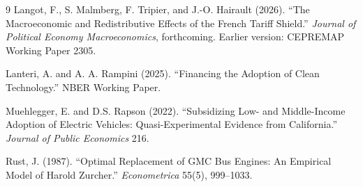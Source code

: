 \begin{thebibliography}{9}
Langot, F., S. Malmberg, F. Tripier, and J.-O. Hairault (2026).
``The Macroeconomic and Redistributive Effects of the French Tariff Shield.''
\emph{Journal of Political Economy Macroeconomics}, forthcoming.
Earlier version: CEPREMAP Working Paper 2305.

Lanteri, A. and A. A. Rampini (2025).
``Financing the Adoption of Clean Technology.'' NBER Working Paper.

Muehlegger, E. and D.S. Rapson (2022).
``Subsidizing Low- and Middle-Income Adoption of Electric Vehicles: Quasi-Experimental Evidence from California.''
\emph{Journal of Public Economics} 216.

Rust, J. (1987).
``Optimal Replacement of GMC Bus Engines: An Empirical Model of Harold Zurcher.''
\emph{Econometrica} 55(5), 999--1033.

\end{thebibliography}
